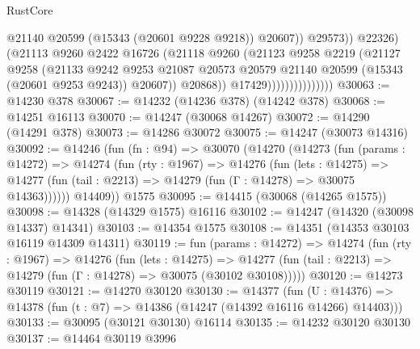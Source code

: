 \begin{lexlean}{RustCore}
\begin{coremodule}
                                          @21140
                                          @20599
                                          (@15343 (@20601 @9228 @9218))
                                          @20607))
                                      @29573))
                                  @22326)
                                (@21113
                                  @9260
                                  @2422
                                  @16726
                                  (@21118
                                    @9260
                                    (@21123
                                      @9258
                                      @2219
                                      (@21127
                                        @9258
                                        (@21133
                                          @9242
                                          @9253
                                          @21087
                                          @20573
                                          @20579
                                          @21140
                                          @20599
                                          (@15343 (@20601 @9253 @9243))
                                          @20607))
                                      @20868))
                                  @17429)))))))))))))))
@30063 := @14230 @378
@30067 := @14232 (@14236 @378) (@14242 @378)
@30068 := @14251 @16113
@30070 := @14247 (@30068 @14267)
@30072 := @14290 (@14291 @378)
@30073 := @14286 @30072
@30075 := @14247 (@30073 @14316)
@30092 := @14246
    (fun (fn : @94) =>
    @30070
      (@14270
        (@14273
          (fun (params : @14272) =>
          @14274
            (fun (rty : @1967) =>
            @14276
              (fun (lets : @14275) =>
              @14277 (fun (tail : @2213) => @14279 (fun (Γ : @14278) => @30075 @14363))))))
        @14409))
    @1575
@30095 := @14415 (@30068 (@14265 @1575))
@30098 := @14328 (@14329 @1575) @16116
@30102 := @14247 (@14320 (@30098 @14337) @14341)
@30103 := @14354 @1575
@30108 := @14351 (@14353 @30103 @16119 @14309 @14311)
@30119 := fun (params : @14272) =>
  @14274
    (fun (rty : @1967) =>
    @14276
      (fun (lets : @14275) =>
      @14277 (fun (tail : @2213) => @14279 (fun (Γ : @14278) => @30075 (@30102 @30108)))))
@30120 := @14273 @30119
@30121 := @14270 @30120
@30130 := @14377
    (fun (U : @14376) => @14378 (fun (t : @7) => @14386 (@14247 (@14392 @16116 @14266) @14403)))
@30133 := @30095 (@30121 @30130) @16114
@30135 := @14232 @30120 @30130
@30137 := @14464 @30119 @3996

\end{coremodule}
\end{lexlean}

